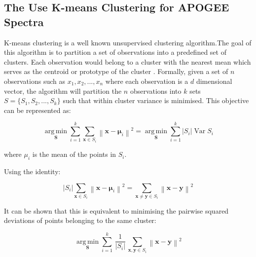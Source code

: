 \subsection{The Use K-means Clustering for APOGEE Spectra}

K-means clustering is a well known unsupervised clustering algorithm.The goal of this algorithm is to partition a set of observations into a predefined set of clusters. Each observation would belong to a cluster with the nearest mean which serves as the centroid or prototype of the cluster \cite{macqueen1967some}. Formally, given a set of $n$ observations such as \(x_1,x_2,...,x_n\) where each observation is a $d$ dimensional vector, the algorithm will partition the $n$ observations into $k$ sets $S=\{S_1,S_2,...,S_k\}$ such that within cluster variance is minimised. This objective can be represented as:

\begin{equation}
{\underset {\mathbf {S} }{\operatorname {arg\,min} }}\sum _{i=1}^{k}\sum _{\mathbf {x} \in S_{i}}\left\|\mathbf {x} -{\boldsymbol {\mu }}_{i}\right\|^{2}={\underset {\mathbf {S} }{\operatorname {arg\,min} }}\sum _{i=1}^{k}|S_{i}|\operatorname {Var} S_{i}
\end{equation}

where $\mu_i$ is the mean of the points in $S_i$. 

Using the identity:

\begin{equation}
    |S_{i}|\sum _{\mathbf {x} \in S_{i}}\left\|\mathbf {x} -{\boldsymbol {\mu }}_{i}\right\|^{2}=\sum _{\mathbf {x} \neq \mathbf {y} \in S_{i}}\left\|\mathbf {x} -\mathbf {y} \right\|^{2}
\end{equation}

It can be shown that this is equivalent to minimising the pairwise squared deviations of points belonging to the same cluster:

\begin{equation}
{\underset {\mathbf {S} }{\operatorname {arg\,min} }}\sum _{i=1}^{k}\,{\frac {1}{|S_{i}|}}\,\sum _{\mathbf {x} ,\mathbf {y} \in S_{i}}\left\|\mathbf {x} -\mathbf {y} \right\|^{2}
\end{equation}


